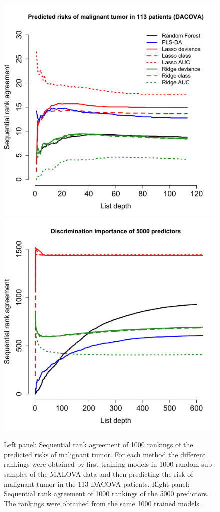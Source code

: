 \documentclass[oupdraft]{bio}
\begin{document}
\newpage


\begin{figure}[htbp]
\begin{center}
\includegraphics[width=.49\textwidth]{pics/riskAgreementPlot}%
\includegraphics[width=.49\textwidth]{pics/predictorAgreementPlot}
\end{center}
\caption{Left panel: Sequential rank agreement of 1000 rankings of the
  predicted risks of malignant tumor. For each method the different
  rankings were obtained by first training models in 1000 random
  sub-samples of the MALOVA data and then predicting the risk of
  malignant tumor in the 113 DACOVA patients. Right panel: Sequential
  rank agreement of 1000 rankings of the 5000 predictors. The rankings
  were obtained from the same 1000 trained models.}
 \label{fig:app1}
\end{figure}

\newpage
\end{document}
